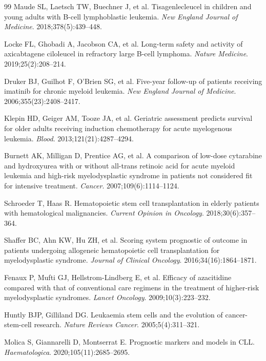 ﻿\documentclass[12pt,a4paper]{article}
\theoremstyle{definition}
\begin{document}
\begin{thebibliography}{99}
  Maude SL, Laetsch TW, Buechner J, et al.
  Tisagenlecleucel in children and young adults with B-cell lymphoblastic leukemia.
  \textit{New England Journal of Medicine}. 2018;378(5):439--448.

  Locke FL, Ghobadi A, Jacobson CA, et al.
  Long-term safety and activity of axicabtagene ciloleucel in refractory large
  B-cell lymphoma.
  \textit{Nature Medicine}. 2019;25(2):208--214.

  Druker BJ, Guilhot F, O'Brien SG, et al.
  Five-year follow-up of patients receiving imatinib for chronic myeloid leukemia.
  \textit{New England Journal of Medicine}. 2006;355(23):2408--2417.

  Klepin HD, Geiger AM, Tooze JA, et al.
  Geriatric assessment predicts survival for older adults receiving induction
  chemotherapy for acute myelogenous leukemia.
  \textit{Blood}. 2013;121(21):4287--4294.

  Burnett AK, Milligan D, Prentice AG, et al.
  A comparison of low-dose cytarabine and hydroxyurea with or without all-trans
  retinoic acid for acute myeloid leukemia and high-risk myelodysplastic syndrome
  in patients not considered fit for intensive treatment.
  \textit{Cancer}. 2007;109(6):1114--1124.

  Schroeder T, Haas R.
  Hematopoietic stem cell transplantation in elderly patients with hematological
  malignancies.
  \textit{Current Opinion in Oncology}. 2018;30(6):357--364.

  Shaffer BC, Ahn KW, Hu ZH, et al.
  Scoring system prognostic of outcome in patients undergoing allogeneic
  hematopoietic cell transplantation for myelodysplastic syndrome.
  \textit{Journal of Clinical Oncology}. 2016;34(16):1864--1871.

  Fenaux P, Mufti GJ, Hellstrom-Lindberg E, et al.
  Efficacy of azacitidine compared with that of conventional care regimens in the
  treatment of higher-risk myelodysplastic syndromes.
  \textit{Lancet Oncology}. 2009;10(3):223--232.

  Huntly BJP, Gilliland DG.
  Leukaemia stem cells and the evolution of cancer-stem-cell research.
  \textit{Nature Reviews Cancer}. 2005;5(4):311--321.

  Molica S, Giannarelli D, Montserrat E.
  Prognostic markers and models in CLL.
  \textit{Haematologica}. 2020;105(11):2685--2695.


\end{thebibliography}
\end{document}
